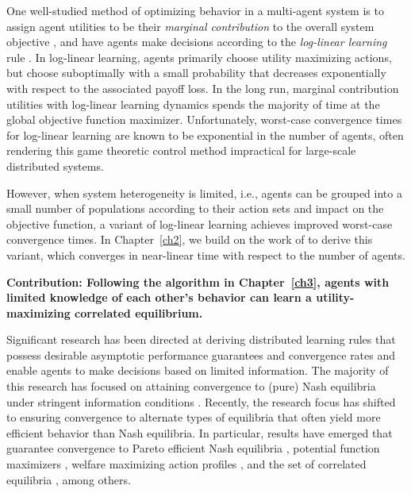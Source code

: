 
One well-studied method of optimizing behavior in a multi-agent system is to assign agent utilities to be their {\it marginal contribution} to the overall system objective \cite{Wolpert1999}, and have agents make decisions according to the {\it log-linear learning} rule \cite{Blume1993}. In log-linear learning, agents primarily choose utility maximizing actions, but choose suboptimally with a small probability that decreases exponentially with respect to the associated payoff loss. In the long run, marginal contribution utilities with log-linear learning dynamics spends the majority of time at the global objective function maximizer. Unfortunately, worst-case convergence times for log-linear learning are known to be exponential in the number of agents, \cite{Shah2010} often rendering this game theoretic control method impractical for large-scale distributed systems. 

However, when system heterogeneity is limited, i.e., agents can be grouped into a small number of populations according to their action sets and impact on the objective function, a variant of log-linear learning achieves improved worst-case convergence times. In Chapter~\ref{ch2}, we build on the work of \cite{Shah2010} to derive this variant, which converges in near-linear time with respect to the number of agents. 


\smallskip

\noindent\textbf{Contribution: Following the algorithm in Chapter~\ref{ch3}, agents with limited knowledge of each other's behavior can learn a utility-maximizing correlated equilibrium.}


Significant research has been directed at deriving distributed learning rules that possess desirable asymptotic performance guarantees and convergence rates and enable agents to make decisions based on limited information. The majority of this research has focused on attaining convergence to (pure) Nash equilibria under stringent information conditions \cite{Young2009, Frihauf2012, Foster2006, Boussaton2012, Poveda2013, Gharesifard2012}. Recently, the research focus has shifted to ensuring convergence to alternate types of equilibria that often yield more efficient behavior than Nash equilibria.  In particular, results have emerged that guarantee convergence to Pareto efficient Nash equilibria \cite{Marden2009,Pradelski2012}, potential function maximizers \cite{Blume1993, Marden2012}, welfare maximizing action profiles \cite{Marden2011, Arieli2012}, and the set of correlated equilibria \cite{Hart2000,Marden2013c,Aumann1987,Foster1997}, among others.  

